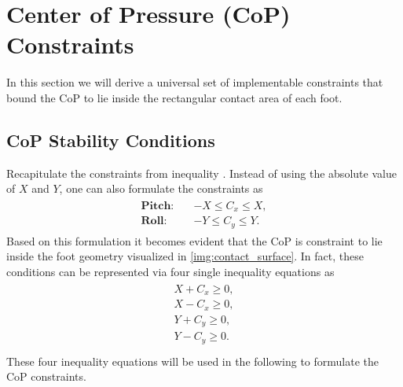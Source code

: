 \section{Center of Pressure (CoP) Constraints}
In this section we will derive a universal set of implementable constraints that bound the \gls{CoP} to lie inside the rectangular contact area of each foot.

\subsection{CoP Stability Conditions}
Recapitulate the constraints from inequality . Instead of using the absolute value of $X$ and $Y$, one can also formulate the constraints as
\begin{align}
\begin{split}
\textbf{Pitch}:\quad& -X \leq C_x \leq X,\\
\textbf{Roll}:\quad& -Y \leq C_y \leq Y.
\end{split}
\end{align}
Based on this formulation it becomes evident that the \gls{CoP} is constraint to lie inside the foot geometry visualized in \cref{img:contact_surface}. In fact, these conditions can be represented via four single inequality equations as
\begin{align}\label{eqn:CoPInequalities}
\begin{split}
X + C_x \geq 0, \\
X - C_x \geq 0, \\
Y + C_y \geq 0, \\
Y - C_y \geq 0. \\
\end{split}
\end{align}
These four inequality equations will be used in the following to formulate the \gls{CoP} constraints.   

